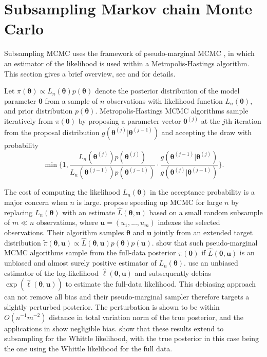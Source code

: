 \documentclass[11pt,english,oneside]{amsart}
\numberwithin{equation}{section}
\theoremstyle{plain}
\numberwithin{equation}{section}
\renewcommand{\v}[1]{\boldsymbol{#1}}
\begin{document}
\section{Subsampling Markov chain Monte Carlo}\label{sec:subsampling_mcmc}
Subsampling MCMC uses the framework of pseudo-marginal MCMC \citep{Andrieu2009}, in which an estimator of the likelihood is used within a Metropolis-Hastings algorithm. This section gives a brief overview, see \cite{quiroz2019speeding} and \cite{salomone2019spectral} for details.

Let $\pi({\v \theta}) \propto L_n({\v \theta})p({\v \theta})$ denote the posterior distribution of the model parameter $\v \theta$ from a sample of $n$ observations with likelihood function $L_n({\v \theta})$, and prior distribution $p({\v \theta})$. Metropolis-Hastings MCMC algorithms sample iteratively from $\pi({\v \theta})$ by proposing a parameter vector ${\v \theta}^{(j)}$ at the $j$th iteration from the proposal distribution $g(\v\theta^{(j)} \vert \v\theta^{(j-1)})$ and accepting the draw with probability
\begin{equation}\label{eq:MHaccProb}
\min\Bigg\{1,
    \frac{L_n(\v\theta^{(j)})p(\v\theta^{(j)})}{L_n(\v\theta^{(j-1)})p(\v\theta^{(j-1)})}
    \cdot
    \frac{g(\v\theta^{(j-1)} \vert \v\theta^{(j)})}{g(\v\theta^{(j)} \vert \v\theta^{(j-1)})}
    \Bigg\}.
\end{equation}

The cost of computing the likelihood $L_n(\v \theta)$ in the acceptance probability is a major concern when $n$ is large. \citet{quiroz2019speeding} propose speeding up MCMC for large $n$ by replacing $L_n(\v \theta)$ with an estimate $\widehat L(\v \theta,\v u)$ based on a small random subsample of $m\ll n$ observations, where $\v u=(u_1,...,u_m)$ indexes the selected observations. Their algorithm samples $\v\theta$ and $\v u$ jointly from an extended target distribution $\tilde \pi (\v\theta,\v u) \propto \widehat L(\v \theta,\v u)p(\v \theta)p(\v u)$. \citet{Andrieu2009} show that such pseudo-marginal MCMC algorithms sample from the full-data posterior $\pi({\v \theta})$ if $\widehat L(\v \theta,\v u)$ is an unbiased and almost surely positive estimator of $L_n(\v \theta)$. \citet{quiroz2019speeding} use an unbiased estimator of the log-likelihood $\widehat \ell(\v\theta,\v u)$ and subsequently debias $\exp(\widehat \ell(\v\theta,\v u))$ to estimate the full-data likelihood. This debiasing approach can not remove all bias and their pseudo-marginal sampler therefore targets a slightly perturbed posterior. The perturbation is shown to be within $O(n^{-1}m^{-2})$ distance in total variation norm of the true posterior, and the applications in \citep{quiroz2019speeding, quiroz2020block, dang2019hamiltonian} show negligible bias. \cite{salomone2019spectral} show that these results extend to subsampling for the Whittle likelihood, with the true posterior in this case being the one using the Whittle likelihood for the full data. 
\end{document}
